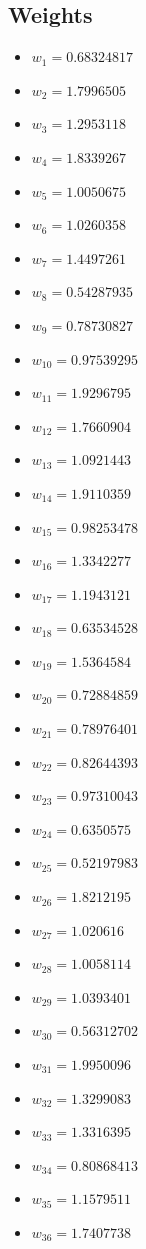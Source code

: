 \documentclass[11pt]{article}
\begin{document}
\subsection*{Weights}
\begin{itemize}
\item $w_{1} = 0.68324817$
\item $w_{2} = 1.7996505$
\item $w_{3} = 1.2953118$
\item $w_{4} = 1.8339267$
\item $w_{5} = 1.0050675$
\item $w_{6} = 1.0260358$
\item $w_{7} = 1.4497261$
\item $w_{8} = 0.54287935$
\item $w_{9} = 0.78730827$
\item $w_{10} = 0.97539295$
\item $w_{11} = 1.9296795$
\item $w_{12} = 1.7660904$
\item $w_{13} = 1.0921443$
\item $w_{14} = 1.9110359$
\item $w_{15} = 0.98253478$
\item $w_{16} = 1.3342277$
\item $w_{17} = 1.1943121$
\item $w_{18} = 0.63534528$
\item $w_{19} = 1.5364584$
\item $w_{20} = 0.72884859$
\item $w_{21} = 0.78976401$
\item $w_{22} = 0.82644393$
\item $w_{23} = 0.97310043$
\item $w_{24} = 0.6350575$
\item $w_{25} = 0.52197983$
\item $w_{26} = 1.8212195$
\item $w_{27} = 1.020616$
\item $w_{28} = 1.0058114$
\item $w_{29} = 1.0393401$
\item $w_{30} = 0.56312702$
\item $w_{31} = 1.9950096$
\item $w_{32} = 1.3299083$
\item $w_{33} = 1.3316395$
\item $w_{34} = 0.80868413$
\item $w_{35} = 1.1579511$
\item $w_{36} = 1.7407738$

\end{itemize}
\end{document}
